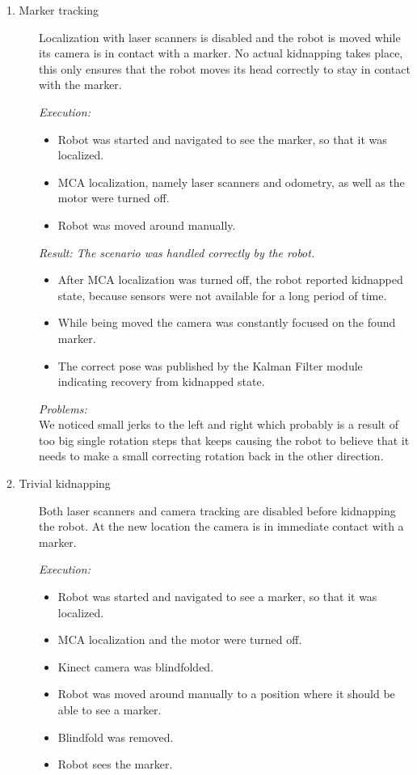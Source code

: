 \begin{description}
\item[1. Marker tracking] Localization with laser scanners is disabled and the robot is moved while its camera is in contact with a marker. No actual kidnapping takes place, this only ensures that the robot moves its head correctly to stay in contact with the marker.

\textit{Execution:}
\begin{itemize}
\item Robot was started and navigated to see the marker, so that it was localized.
\item MCA localization, namely laser scanners and odometry, as well as the motor were turned off.
\item Robot was moved around manually.
\end{itemize}

\textit{Result: The scenario was handled correctly by the robot.}
\begin{itemize}
\item After MCA localization was turned off, the robot reported kidnapped state, because sensors were not available for a long period of time.
\item While being moved the camera was constantly focused on the found marker.
\item The correct pose was published by the Kalman Filter module indicating recovery from kidnapped state.
\end{itemize}

\textit{Problems:}\\
We noticed small jerks to the left and right which probably is a result of too big single rotation steps that keeps causing the robot to believe that it needs to make a small correcting rotation back in the other direction.

\item[2. Trivial kidnapping] Both laser scanners and camera tracking are disabled before kidnapping the robot. At the new location the camera is in immediate contact with a marker.

\textit{Execution:}
\begin{itemize}
\item Robot was started and navigated to see a marker, so that it was localized.
\item MCA localization and the motor were turned off. 
\item Kinect camera was blindfolded.
\item Robot was moved around manually to a position where it should be able to see a marker.
\item Blindfold was removed.
\item Robot sees the marker.
\end{itemize} 


\end{description}

